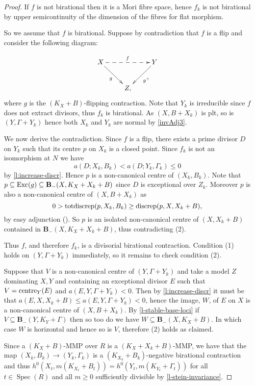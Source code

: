 \documentclass[a4paper,12pt]{book}
\DeclareMathOperator{\Spec}{Spec}
\newcommand{\cent}{\textup{centre}}
\begin{document}
	\begin{proof}
		If $f$ is not birational then it is a Mori fibre space, hence $f_k$ is not birational by upper semicontinuity of the dimension of the fibres for flat morphism. 
		
		So we assume that $f$ is birational. Suppose by contradiction that $f$ is a flip and consider the following diagram:
		
		\begin{equation*}
		\xymatrix{
			X \ar@{->}_{g}[rd] \ar@{-->}^{f}[rr]
			&
			& Y \ar@{->}^{g^+}[ld]\\
			&Z,}
		\end{equation*} 
		where $g$ is the $(K_X+B)$-flipping contraction.
		Note that $Y_k$ is irreducible since $f$ does not extract divisors, thus $f_k$ is birational. As $(X,B+X_k)$ is plt, so is $(Y,\Gamma+Y_k)$ hence both $X_k$ and $Y_k$ are normal by \autoref{invAdj3}. 
		
		We now derive the contradiction. Since $f$ is a flip, there exists a prime divisor $D$ on $Y_k$ such that its centre $p$ on $X_k$ is a closed point.
		Since $f_k$ is not an isomorphism at $N$ we have
		$$a(D;X_k,B_k)<a(D;Y_k,\Gamma_k)\leq 0$$
		by \autoref{l:increase-discr}.
		Hence $p$ is a non-canonical centre of $(X_{k},B_k)$. Note that $p \subseteq \textup{Exc}(g) \subseteq \mathbf{B}_{-}(X, K_{X}+X_k+B)$ since $D$ is exceptional over $Z_k$. 
		Moreover $p$ is also a non-canonical centre of $(X,B+X_{k})$ as $$0 > \textup{totdiscrep}(p, X_k, B_k) \geq \textup{discrep}(p, X, X_k+B), $$ by easy adjunction (\cite[Theorem 17.2]{FA}).
		So $p$ is an isolated non-canonical centre of $(X,X_k+B)$ contained in $\mathbf{B}_{-}(X, K_{X}+X_k+B)$, thus contradicting (2).
		
		Thus $f$, and therefore $f_k$, is a divisorial birational contraction. Condition (1) holds on $(Y,\Gamma+Y_k)$ immediately, so it remains to check condition (2).
		
		Suppose that $V$ is a non-canonical centre of $(Y,\Gamma+Y_{k})$ and take a model $Z$ dominating $X,Y$ and containing an exceptional divisor $E$ such that $V=\cent_Y(E)$ and $a(E, Y, \Gamma+Y_{k}) <0$. Then by \autoref{l:increase-discr} it must be that $a(E,X,X_k+B) \leq a(E,Y,\Gamma+Y_{k}) < 0$, hence the image, $W$, of $E$ on $X$ is a non-canonical centre of $(X,B+X_{k})$. By \autoref{l-stable-base-loci} if $V \subseteq \mathbf{B}_{-}(Y, K_{Y}+\Gamma)$ then so too do we have $W \subseteq \mathbf{B}_{-}(X, K_{X}+B)$. In which case $W$ is horizontal and hence so is $V$, therefore (2) holds as claimed.

		Since a $(K_X+B)$-MMP over $R$ is a $(K_X+X_k+B)$-MMP, we have that the map $(X_k,B_k) \rightarrow (Y_k, \Gamma_k)$ is a $(K_{X_k}+B_k)$-negative birational contraction and thus $h^0(X_t,m(K_{X_t}+B_t))=h^0(Y_t,m(K_{Y_t}+\Gamma_t))$ for all $t\in\Spec (R)$ and all $m\geq 0$ sufficiently divisible by \autoref{l-stein-invariance}.
	\end{proof}
	
\end{document}
